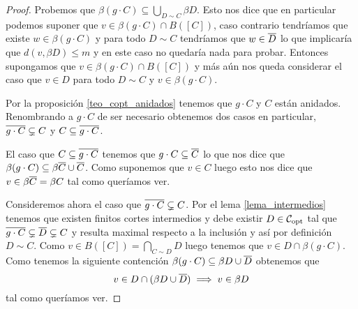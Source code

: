 \documentclass[tesis.tex]{subfiles}
\begin{document}
\begin{proof}
	Probemos que $\beta (g \cdot C) \subseteq \bigcup_{D \sim C} \beta D$.
	Esto nos dice que en particular podemos suponer que $v \in \beta (g \cdot C) \cap B([C])$, caso contrario tendríamos que existe $w \in \beta (g \cdot C)$ y para todo $D \sim C$ tendríamos que $w \in \overline D$ lo que implicaría  que $d(v,\beta D) \le m$ y en este caso no quedaría nada para probar.
	Entonces supongamos que $ v \in \beta (g \cdot C) \cap B([C])$ y más aún nos queda considerar el caso que $v \in D$ para todo $D \sim C$ y $v \in \beta (g \cdot C)$.
	
	Por la proposición \ref{teo_copt_anidados} tenemos que $g \cdot C$ y $C$ están anidados.
	Renombrando a $g \cdot C$ de ser necesario obtenemos dos casos en particular, $\overline{ g \cdot C} \subsetneq C$ y $C \subseteq \overline {g \cdot C}$.
	
	El caso que $C \subseteq \overline{ g \cdot C}$ tenemos que $ g \cdot C \subseteq \overline C$ lo que nos dice que $\beta (g \cdot C) \subseteq \beta \overline C \cup \overline C$.
	Como suponemos que $v \in C$ luego esto nos dice que $v \in \beta \overline C = \beta C$ tal como queríamos ver.
	
	Consideremos ahora el caso que ${\overline{ g \cdot C}} \subsetneq C$.
	Por el lema \ref{lema_intermedios} tenemos que existen finitos cortes intermedios y debe existir $D \in {\cal C}_{\text{opt}}$ tal que 
	$\overline{g \cdot C}  \subsetneq \overline D \subsetneq C$ y resulta maximal respecto a la inclusión y así por definición $D \sim C$.
	Como $v \in B([C]) = \bigcap_{C \sim D} D $ luego tenemos que $v \in D \cap \beta (g \cdot C)$.
	Como tenemos la siguiente contención $\beta (g \cdot C) \subseteq \beta D \cup \overline D$ obtenemos que
	\[
		v \in D \cap (\beta D \cup \overline D) \implies v \in \beta D
	\]
	tal como queríamos ver. 
\end{proof}
\end{document}
